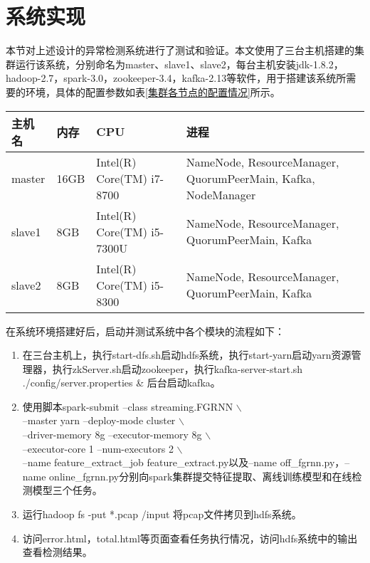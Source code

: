 \section{系统实现}
本节对上述设计的异常检测系统进行了测试和验证。本文使用了三台主机搭建的集群运行该系统，分别命名为master、slave1、slave2，每台主机安装jdk-1.8.2，hadoop-2.7，spark-3.0，zookeeper-3.4，kafka-2.13等软件，用于搭建该系统所需要的环境，具体的配置参数如表\ref{集群各节点的配置情况}所示。
\begin{table*}[h]
  \small
  \caption{集群各节点的配置情况}
  \label{集群各节点的配置情况}
  \centering
  \begin{tabular}{p{}<{\centering} p{}<{\centering} p{}<{\centering} p{}<{\centering}}
  \toprule
  主机名 & 内存 & CPU &  进程 \\
  
  \midrule
 master & 16GB & Intel(R) Core(TM) i7-8700 & NameNode, ResourceManager, QuorumPeerMain, Kafka, NodeManager \\
 slave1 & 8GB & Intel(R) Core(TM) i5-7300U & NameNode, ResourceManager, QuorumPeerMain, Kafka \\
 slave2 & 8GB & Intel(R) Core(TM) i5-8300 & NameNode, ResourceManager, QuorumPeerMain, Kafka \\
 
   \bottomrule
  
  \end{tabular}
  \end{table*}

在系统环境搭建好后，启动并测试系统中各个模块的流程如下：
\begin{enumerate}
  \item 在三台主机上，执行start-dfs.sh启动hdfs系统，执行start-yarn启动yarn资源管理器，执行zkServer.sh启动zookeeper，执行kafka-server-start.sh ./config/server.properties \& 后台启动kafka。
  \item 使用脚本spark-submit --class streaming.FGRNN $\backslash$ \\
  --master yarn --deploy-mode cluster $\backslash$ \\
  --driver-memory 8g --executor-memory 8g $\backslash$ \\
  --executor-core 1 --num-executors 2 $\backslash$ \\
 --name feature\_extract\_job feature\_extract.py以及--name off\_fgrnn.py，--name online\_fgrnn.py分别向spark集群提交特征提取、离线训练模型和在线检测模型三个任务。
 \item 运行hadoop fs -put *.pcap /input 将pcap文件拷贝到hdfs系统。
 \item 访问error.html，total.html等页面查看任务执行情况，访问hdfs系统中的输出查看检测结果。
\end{enumerate}

